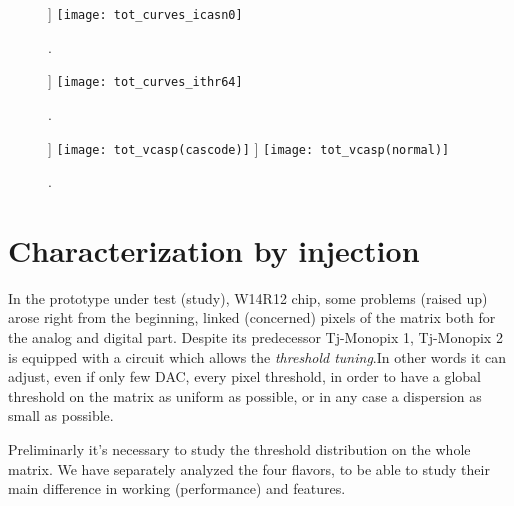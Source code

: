 \begin{figure}[h!]
\centering
\subfigure[ToT vs $I_{THR}$ ($I_{CASN}$=0 DAC) - Data [\textbf{Cascode}]]
{\texttt{[image: tot\_curves\_icasn0]}}\quad
{}\\
\caption{.}
\label{fig:tot_vs_ithr}
\end{figure}

\begin{figure}[h!]
\centering
\subfigure[ToT vs $I_{CASN}$ ($I_{THR}$=64 DAC) - Data [\textbf{Cascode}]]
{\texttt{[image: tot\_curves\_ithr64]}}\quad
{}\\
\caption{.}
\label{fig:tot_vs_icasn}
\end{figure}

\begin{figure}[h!]
\centering
\subfigure[ToT vs $V_{CASP}$ - Data [\textbf{Cascode}]]
{\texttt{[image: tot\_vcasp(cascode)]}}\quad
\subfigure[ToT vs $V_{CASP}$ - Data [\textbf{Normal}]]
{\texttt{[image: tot\_vcasp(normal)]}}\\
\caption{.}
\label{fig:tot_vs_vcasp}
\end{figure}



\section{Characterization by injection}

In the prototype under test (study), W14R12 chip, some problems (raised up) arose right from the beginning, linked (concerned) pixels of the matrix both for the analog and digital part.
Despite its predecessor Tj-Monopix 1, Tj-Monopix 2 is equipped with a circuit which allows the \textit{threshold tuning}.In other words it can adjust, even if only few DAC, every pixel threshold, in order to have a global threshold on the matrix as uniform as possible, or in any case a dispersion as small as possible.

Preliminarly it's necessary to study the threshold distribution on the whole matrix. We have separately analyzed the four flavors, to be able to study their main difference in working (performance) and features.

